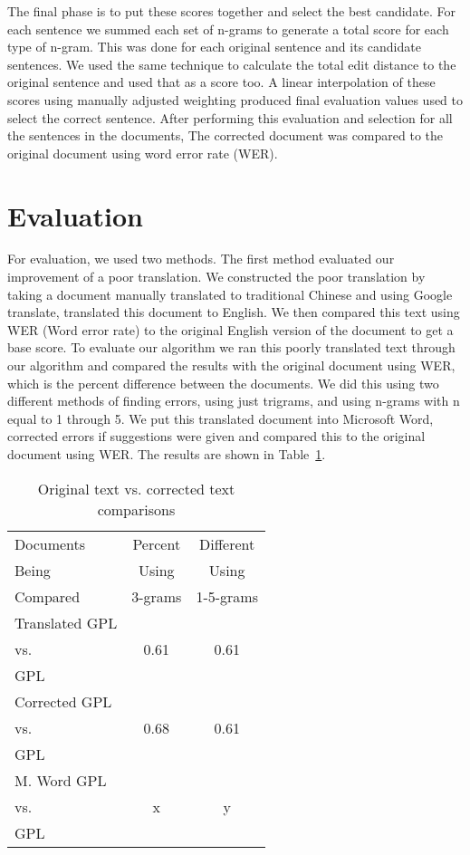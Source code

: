 \documentclass[twocolumn]{article}
\begin{document}
The final phase is to put these scores together and select the best candidate.
For each sentence we summed each set of n-grams to generate a total score for
each type of n-gram. This was done for each original sentence and its candidate
sentences. We used the same technique to calculate the total edit distance to
the original sentence and used that as a score too. A linear interpolation of
these scores using manually adjusted weighting produced final evaluation values
used to select the correct sentence. After performing this evaluation and
selection for all the sentences in the documents, The corrected document was
compared to the original document using word error rate (WER).

\section{Evaluation}
For evaluation, we used two methods. The first method evaluated our improvement
of a poor translation. We constructed the poor translation by taking a document
manually translated to traditional Chinese and using Google translate,
translated this document to English. We then compared this text using WER (Word
error rate) to the original English version of the document to get a base score.
To evaluate our algorithm we ran this poorly translated text through our
algorithm and compared the results with the original document using WER, which
is the percent difference between the documents. We did this using two different
methods of finding errors, using just trigrams, and using n-grams with n equal
to 1 through 5. We put this translated document into Microsoft Word, corrected
errors if suggestions were given and compared this to the original document
using WER. The results are shown in Table~\ref{gpl}.

\begin{table}[t]
    \centering
    \begin{tabular}{ | l | cc | }
        \hline
        Documents & Percent & Different \\
        \cline{2-3} Being & Using & \multicolumn{1}{|c|}{Using} \\
        Compared & 3-grams & \multicolumn{1}{|c|}{1-5-grams} \\
        \hline
        Translated GPL & & \multicolumn{1}{|c|}{} \\
        vs. & 0.61 & \multicolumn{1}{|c|}{0.61} \\
        GPL & & \multicolumn{1}{|c|}{} \\
        \hline
        Corrected GPL & & \multicolumn{1}{|c|}{} \\
        vs. & 0.68 & \multicolumn{1}{|c|}{0.61} \\
        GPL & & \multicolumn{1}{|c|}{} \\
        \hline
        M. Word GPL & & \multicolumn{1}{|c|}{} \\
        vs. & x & \multicolumn{1}{|c|}{y} \\
        GPL & & \multicolumn{1}{|c|}{} \\
        \hline
    \end{tabular}
    \caption{Original text vs. corrected text comparisons}
    \label{gpl}
\end{table}
\end{document}
